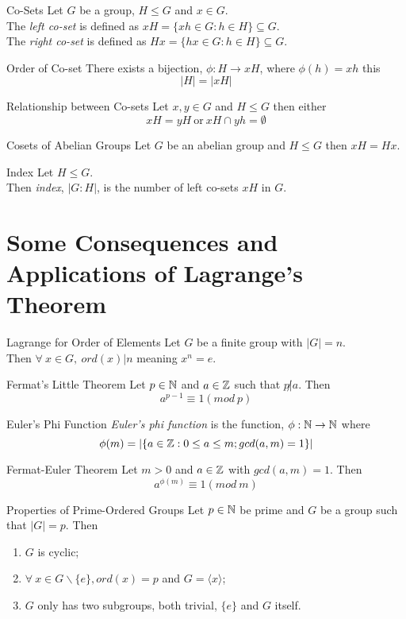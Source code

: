 \documentclass[11pt,a4paper]{article}
\begin{document}
\subtitle{Definition 11.2 - }{Co-Sets}
Let $G$ be a group, $H \leq G$ and $x \in G$.\\
The \textit{left co-set} is defined as $xH = \{xh \in G : h \in H\} \subseteq G$.\\
The \textit{right co-set} is defined as $Hx = \{hx \in G : h \in H\} \subseteq G$.\\

\subtitle{Theorem 11.3 - }{Order of Co-set}
There exists a bijection, $\phi : H \to xH$, where $\phi(h) = xh$ this
$$|H| = |xH|$$

\subtitle{Theorem 11.4 - }{Relationship between Co-sets}
Let $x, y \in G$ and $H \leq G$ then either
$$xH = yH \mathrm{\ or\ } xH \cap yh = \emptyset$$

\subtitle{Theorem 11.5 - }{Cosets of Abelian Groups}
Let $G$ be an abelian group and $H \leq G$ then $xH = Hx$.\\

\subtitle{Definition 11.6 - }{Index}
Let $H \leq G$.\\
Then \textit{index}, $|G : H|$, is the number of left co-sets $xH$ in $G$.

\section{Some Consequences and Applications of Lagrange's Theorem}

\subtitle{Propostion 12.1 - }{Lagrange for Order of Elements}
Let $G$ be a finite group with $|G| = n$.\\
Then $\forall\ x \in G,\ ord(x) | n$ meaning $x^n = e$.\\

\subtitle{Theorem 12.2 - }{Fermat's Little Theorem}
Let $p \in \mathbb{N}$ and $a \in \mathbb{Z}$ such that $p \not | a$. Then
$$a^{p-1} \equiv 1 (mod\ p)$$

\subtitle{Definition 12.3 - }{Euler's Phi Function}
\textit{Euler's phi function} is the function, $\phi : \mathbb{N} \to \mathbb{N}$ where
$$\phi(m) = |\{ a \in \mathbb{Z} : 0 \leq a \leq m; gcd(a, m) = 1 \}|$$

\subtitle{Theorem 12.4 - }{Fermat-Euler Theorem}
Let $m > 0$ and $a \in \mathbb{Z}$ with $gcd(a, m) = 1$. Then
$$a^{\phi(m)} \equiv 1 (mod\ m)$$

\subtitle{Theorem 12.5 - }{Properties of Prime-Ordered Groups}
Let $p \in \mathbb{N}$ be prime and $G$ be a group such that $|G| = p$. Then
\begin{enumerate}[label=\roman*)]
  \item $G$ is cyclic;
  \item $\forall\ x \in G \backslash \{e\}, ord(x) = p$ and $G = \langle x \rangle$;
  \item $G$ only has two subgroups, both trivial, $\{e\}$ and $G$ itself.
\end{enumerate}
\end{document}

